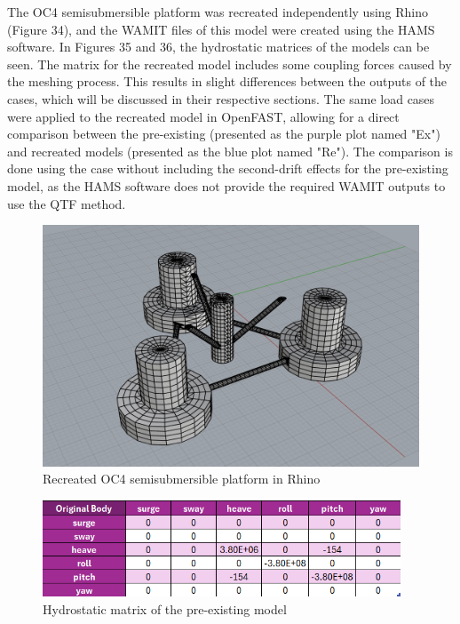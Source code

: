 \documentclass[a4paper, 11pt]{article}
\begin{document}
\hspace*{0.5cm}The OC4 semisubmersible platform was recreated independently using Rhino (Figure 34), and the WAMIT files of this model were created using the HAMS software. In Figures 35 and 36, the hydrostatic matrices of the models can be seen. The matrix for the recreated model includes some coupling forces caused by the meshing process. This results in slight differences between the outputs of the cases, which will be discussed in their respective sections. The same load cases were applied to the recreated model in OpenFAST, allowing for a direct comparison between the pre-existing (presented as the purple plot named "Ex") and recreated models (presented as the blue plot named "Re"). The comparison is done using the case without including the second-drift effects for the pre-existing model, as the HAMS software does not provide the required WAMIT outputs to use the QTF method.

\begin{figure}[H]
    \centering
    \includegraphics[width=1\textwidth]{rhino.png}
    \caption{\small Recreated OC4 semisubmersible platform in Rhino}
    \label{fig:rhino}
\end{figure}

\begin{figure}[H]
    \centering
    \includegraphics[width=0.95\textwidth]{hyd_st_org.png}
    \caption{\small Hydrostatic matrix of the pre-existing model}
    \label{fig:hyd_st_org}
\end{figure}
\end{document}
